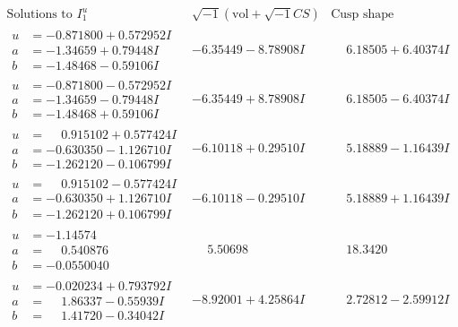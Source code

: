 \documentclass[1p]{elsarticle_modified}
\theoremstyle{definition}
\newcommand{\I}{\sqrt{-1}}
\begin{document}
$$\begin{array}{c|c|c}  
\text{Solutions to }I^u_{1}& \I (\text{vol} + \sqrt{-1}CS) & \text{Cusp shape}\\
 \hline 
\begin{aligned}
u &= -0.871800 + 0.572952 I \\
a &= -1.34659 + 0.79448 I \\
b &= -1.48468 - 0.59106 I\end{aligned}
 & -6.35449 - 8.78908 I & \phantom{-}6.18505 + 6.40374 I \\ \hline\begin{aligned}
u &= -0.871800 - 0.572952 I \\
a &= -1.34659 - 0.79448 I \\
b &= -1.48468 + 0.59106 I\end{aligned}
 & -6.35449 + 8.78908 I & \phantom{-}6.18505 - 6.40374 I \\ \hline\begin{aligned}
u &= \phantom{-}0.915102 + 0.577424 I \\
a &= -0.630350 - 1.126710 I \\
b &= -1.262120 - 0.106799 I\end{aligned}
 & -6.10118 + 0.29510 I & \phantom{-}5.18889 - 1.16439 I \\ \hline\begin{aligned}
u &= \phantom{-}0.915102 - 0.577424 I \\
a &= -0.630350 + 1.126710 I \\
b &= -1.262120 + 0.106799 I\end{aligned}
 & -6.10118 - 0.29510 I & \phantom{-}5.18889 + 1.16439 I \\ \hline\begin{aligned}
u &= -1.14574\phantom{ +0.000000I} \\
a &= \phantom{-}0.540876\phantom{ +0.000000I} \\
b &= -0.0550040\phantom{ +0.000000I}\end{aligned}
 & \phantom{-}5.50698\phantom{ +0.000000I} & \phantom{-}18.3420\phantom{ +0.000000I} \\ \hline\begin{aligned}
u &= -0.020234 + 0.793792 I \\
a &= \phantom{-}1.86337 - 0.55939 I \\
b &= \phantom{-}1.41720 - 0.34042 I\end{aligned}
 & -8.92001 + 4.25864 I & \phantom{-}2.72812 - 2.59912 I \\ \hline\begin{aligned}

\end{aligned}
\end{array}$$
\end{document}
